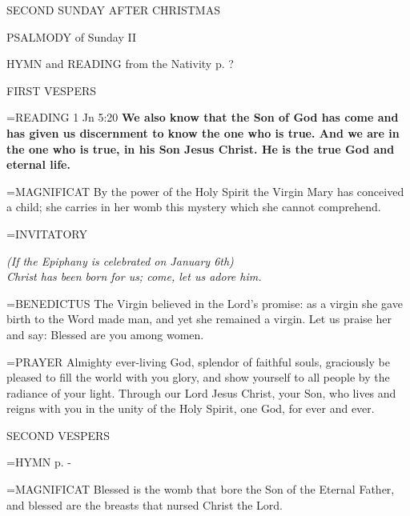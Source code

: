 \begin{center}\normalsize SECOND SUNDAY AFTER CHRISTMAS\\
\end{center}

PSALMODY of Sunday II

HYMN and READING from the Nativity p. ?

\begin{flushleft}\normalsize FIRST VESPERS\\\end{flushleft}

\hangindent=\parindent \small{\uppercase{READING}}    1 Jn 5:20 \textbf{    We also know that the Son of God has come and has given us discernment to know the one who is true. And we are in the one who is true, in his Son Jesus Christ. He is the true God and eternal life.\\}

\hangindent=\parindent \small{MAGNIFICAT 	By the power of the Holy Spirit the Virgin Mary has conceived a child; she carries in her womb this mystery which she cannot comprehend.\\}

\hangindent=\parindent \small{INVITATORY}
\begin{center}
\textit{(If the Epiphany is celebrated on January 6th)\\}
\textit{Christ has been born for us; come, let us adore him.\\}
\end{center}

\hangindent=\parindent \small{BENEDICTUS 	The Virgin believed in the Lord's promise: as a virgin she gave birth to the Word made man, and yet she remained a virgin. Let us praise her and say: Blessed are you among women.\\}

\hangindent=\parindent \small{PRAYER 	Almighty ever-living God, splendor of faithful souls, graciously be pleased to fill the world with you glory, and show yourself to all people by the radiance of your light. Through our Lord Jesus Christ, your Son, who lives and reigns with you in the unity of the Holy Spirit, one God, for ever and ever.}

\begin{flushleft}\normalsize SECOND VESPERS\\\end{flushleft}

\hangindent=\parindent \small{\uppercase{HYMN} p. \pageref{christmas:firstHymn}-\pageref{christmas:lastHymn}\\}

\hangindent=\parindent \small{MAGNIFICAT 	Blessed is the womb that bore the Son of the Eternal Father, and blessed are the breasts that nursed Christ the Lord.\\}
